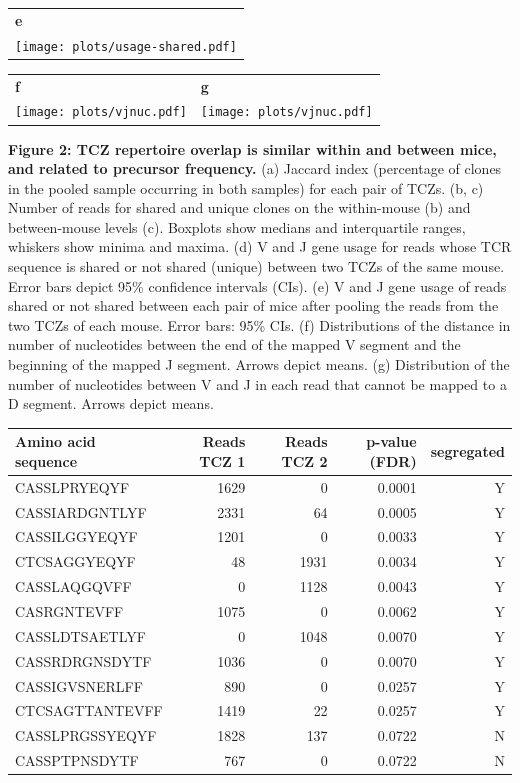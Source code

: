 \documentclass[a4paper]{article}
\newcommand{\s}[1]{{\bfseries\Large #1}}
\begin{document}
\begin{tabular}{l}
\s{e} \\[-1em]
\texttt{[image: plots/usage-shared.pdf]}
\end{tabular}

\begin{tabular}{ll}
\s{f} & \s{g} \\[-1em]
\texttt{[image: plots/vjnuc.pdf]} & 
\texttt{[image: plots/vjnuc.pdf]}
\end{tabular}

{\bf Figure 2: TCZ repertoire overlap is similar within and between mice, and related to precursor frequency.} (a) Jaccard index (percentage of clones in the pooled sample occurring in both samples) for each pair of TCZs. (b, c) Number of reads for shared and unique clones on the within-mouse (b) and between-mouse levels (c). Boxplots show medians and interquartile ranges, whiskers show minima and maxima. (d) V and J gene usage for reads whose TCR sequence is shared or not shared (unique) between two TCZs of the same mouse. Error bars depict 95\% confidence intervals (CIs). (e) V and J gene usage of reads shared or not shared between each pair of mice after pooling the reads from the two TCZs of each mouse. Error bars: 95\% CIs. (f) Distributions of the distance in number of nucleotides between the end of the mapped V segment and the beginning of the mapped J segment. Arrows depict means. (g) Distribution of the number of nucleotides between V and J in each read that cannot be mapped to a D segment. Arrows depict means.

\newpage

\begin{tabular}{lrrrr}

Amino acid sequence&
Reads TCZ 1 &
Reads TCZ 2 &
p-value (FDR) &
segregated \\

\hline

CASSLPRYEQYF	&1629	&0	&0.0001	&Y \\
CASSIARDGNTLYF	&2331	&64	&0.0005	&Y \\
CASSILGGYEQYF	&1201	&0	&0.0033	&Y \\
CTCSAGGYEQYF	&48	&1931	&0.0034	&Y \\
CASSLAQGQVFF	&0	&1128	&0.0043	&Y \\
CASRGNTEVFF	&1075	&0	&0.0062	&Y \\
CASSLDTSAETLYF	&0	&1048	&0.0070	&Y \\
CASSRDRGNSDYTF	&1036	&0	&0.0070	&Y \\
CASSIGVSNERLFF	&890	&0	&0.0257	&Y \\
CTCSAGTTANTEVFF	&1419	&22	&0.0257	&Y \\
CASSLPRGSSYEQYF	&1828	&137	&0.0722	&N \\
CASSPTPNSDYTF	&767	&0	&0.0722	&N

\end{tabular}
\end{document}
